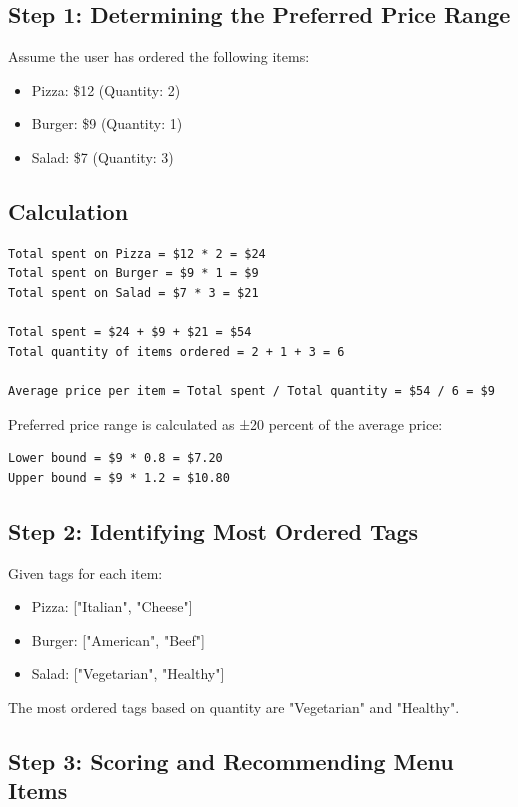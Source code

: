 \subsection*{Step 1: Determining the Preferred Price Range}

Assume the user has ordered the following items:

\begin{itemize}
    \item Pizza: \$12 (Quantity: 2)
    \item Burger: \$9 (Quantity: 1)
    \item Salad: \$7 (Quantity: 3)
\end{itemize}

\subsection*{Calculation}

\begin{verbatim}
Total spent on Pizza = $12 * 2 = $24
Total spent on Burger = $9 * 1 = $9
Total spent on Salad = $7 * 3 = $21

Total spent = $24 + $9 + $21 = $54
Total quantity of items ordered = 2 + 1 + 3 = 6

Average price per item = Total spent / Total quantity = $54 / 6 = $9
\end{verbatim}

Preferred price range is calculated as ±20 percent of the average price:
\begin{verbatim}
Lower bound = $9 * 0.8 = $7.20
Upper bound = $9 * 1.2 = $10.80
\end{verbatim}

\subsection*{Step 2: Identifying Most Ordered Tags}

Given tags for each item:
\begin{itemize}
    \item Pizza: ["Italian", "Cheese"]
    \item Burger: ["American", "Beef"]
    \item Salad: ["Vegetarian", "Healthy"]
\end{itemize}

The most ordered tags based on quantity are "Vegetarian" and "Healthy".

\subsection*{Step 3: Scoring and Recommending Menu Items}

